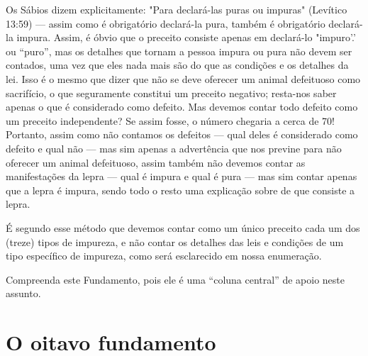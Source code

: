 Os Sábios dizem explicitamente: "Para declará-las puras ou impuras"
(Levítico 13:59) --- assim como é obrigatório declará-la pura, também é
obriga­tório declará-la impura. Assim, é óbvio que o preceito consiste
apenas em declará-lo "impuro'.' ou ``puro'', mas os detalhes que tornam a
pessoa impura ou pura não devem ser contados, uma vez que eles nada mais
são do que as condições e os detalhes da lei. Isso é o mesmo que dizer
que não se deve ofere­cer um animal defeituoso como sacrifício, o que
seguramente constitui um pre­ceito negativo; resta-nos saber apenas o
que é considerado como defeito. Mas devemos contar todo defeito como um
preceito independente? Se assim fosse, o número chegaria a cerca de 70!
Portanto, assim como não contamos os defei­tos --- qual deles é
considerado como defeito e qual não --- mas sim apenas a advertência que
nos previne para não oferecer um animal defeituoso, assim tam­bém não
devemos contar as manifestações da lepra --- qual é impura e qual é pura
--- mas sim contar apenas que a lepra é impura, sendo todo o resto uma
explicação sobre de que consiste a lepra.

É segundo esse método que devemos contar como um único pre­ceito cada um
dos (treze) tipos de impureza, e não contar os detalhes das leis e
condições de um tipo específico de impureza, como será esclarecido em
nos­sa enumeração.

Compreenda este Fundamento, pois ele é uma ``coluna central'' de apoio
neste assunto.

\chapter*{O oitavo fundamento}

